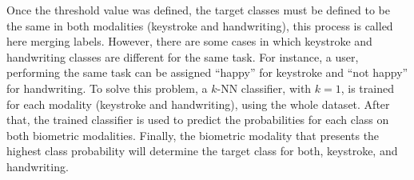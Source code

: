 \documentclass[conference]{IEEEtran}
\begin{document}



Once the threshold value was defined, the target classes must be defined to be the same in both modalities (keystroke and handwriting), this process is called here merging labels. However, there are some cases in which keystroke and handwriting classes are different for the same task. For instance, a user, performing the same task can be assigned ``happy'' for keystroke and ``not happy'' for handwriting.
To solve this problem, a $k$-NN classifier, with $k = 1$, is trained for each modality (keystroke and handwriting), using the whole dataset. After that, the trained classifier is used to predict the probabilities for each class on both biometric modalities. Finally, the biometric modality that presents the highest class probability will determine the target class for both, keystroke, and handwriting.  
\end{document}
